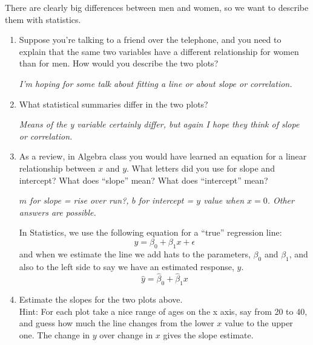 There are clearly big differences between men and women, so we want to
describe them with statistics.\vspace{-.5cm}
\begin{enumerate}
  \item Suppose you're talking to a friend over the telephone, and
    you need to explain  that the same two variables
    have a different relationship for women than for men. How would you
    describe the two plots? 
\begin{students}
 \vspace{2cm}      
\end{students}

\begin{key}
  {\it  I'm hoping for some talk about fitting a line or about slope
    or correlation.}
\end{key}

\item What statistical summaries differ in the two plots?
\begin{students}
 \vspace{2cm}      
\end{students}

\begin{key}
  {\it  Means of the y variable certainly differ,  but again I hope
    they think of slope  or correlation. }
\end{key}



\item As a review, in Algebra class you would have learned an equation
  for a linear relationship between $x$ and $y$.  What letters did you
  use for slope and intercept?  What does ``slope'' mean?  What does
  ``intercept'' mean?
\begin{students}
 \vspace{2cm}      
\end{students}

\begin{key}
  {\it $m$ for slope = rise over run?, $b$ for intercept = $y$ value
    when $x=0$. Other answers are possible.}
\end{key}


  In Statistics, we use the following equation for a ``true'' regression  line:
  $$ y = \beta_0 + \beta_1 x + \epsilon  $$
  and when we estimate the line we add hats to the parameters,
  $\beta_0$ and $\beta_1$, and also to the left side to say we have an
  estimated response, $\hat{y}$.
  $$ \hat{y} = \hat{\beta}_0 + \hat{\beta}_1 x$$
\item Estimate the  slopes for the two plots above.\\
     Hint: For each plot take a nice range of ages on the x axis, say
    from 20 to 40, and guess how much the line changes from the lower
    $x$ value to the upper one.  The change in $y$ over change in $x$
    gives the slope estimate.
\begin{students}
 \vspace{2cm}      
\end{students}


\end{enumerate}
